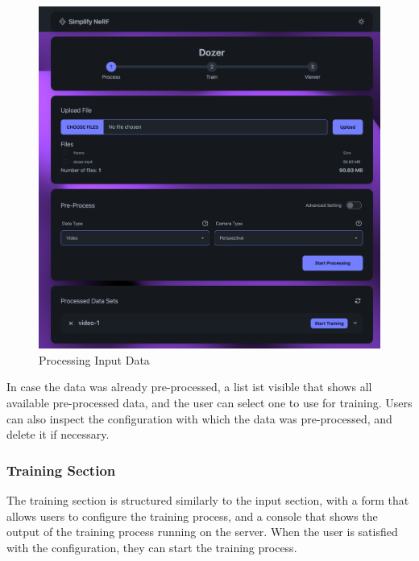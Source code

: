 \begin{figure}[htb]
  \includegraphics[width=\textwidth]{figures/view-process.png}
  \caption{Processing Input Data}
  \label{fig:design:input-section}
\end{figure}

In case the data was already pre-processed, a list ist visible that shows all available pre-processed data, and the user can select one to use for training.
Users can also inspect the configuration with which the data was pre-processed, and delete it if necessary.

\subsubsection{Training Section}

The training section is structured similarly to the input section, with a form that allows users to configure the training process, and a console that shows the output of the training process running on the server.
When the user is satisfied with the configuration, they can start the training process.

